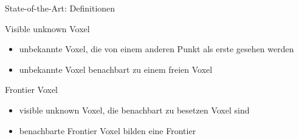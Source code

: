\documentclass{beamer}
\begin{document}
\begin{frame}{State-of-the-Art: Definitionen}
	\begin{exampleblock}{Visible unknown Voxel}
		\begin{itemize}
			\item unbekannte Voxel, die von einem anderen Punkt als erste gesehen werden
			\item unbekannte Voxel benachbart zu einem freien Voxel
		\end{itemize}
		\cite{vasquez-gomez_vpl_2020}
	\end{exampleblock}
	\begin{exampleblock}{Frontier Voxel}
		\begin{itemize}
			\item visible unknown Voxel, die benachbart zu besetzen Voxel sind
			\item benachbarte Frontier Voxel bilden eine Frontier

		\end{itemize}
		\cite{vasquez-gomez_vpl_2020}
	\end{exampleblock}
\end{frame}

\begin{frame}{}
	\begin{figure}
		\hspace{2.2cm}
		\caption{\cite{vasquez-gomez_vpl_2020}}
	\end{figure}
\end{frame}
\end{document}
